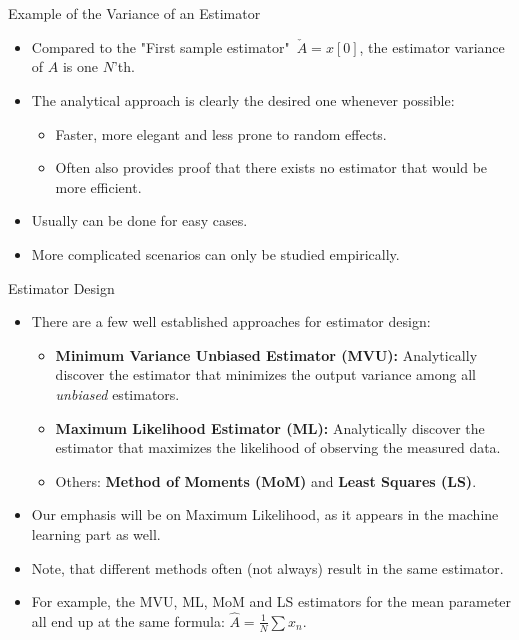 \documentclass[10pt, aspectratio=169]{beamer} %
\begin{document}
\begin{frame}{Example of the Variance of an Estimator}
\begin{itemize}
\item Compared to the "First sample estimator"\ $\check{A} = x[0]$, the estimator variance of $\hat{A}$ is one $N$'th.
\item The analytical approach is clearly the desired one whenever possible:
\begin{itemize}
\item Faster, more elegant and less prone to random effects.
\item Often also provides proof that there exists no estimator that would be more efficient.
\end{itemize}
\item Usually can be done for easy cases.
\item More complicated scenarios can only be studied empirically.
\end{itemize}
\end{frame}

\begin{frame}{Estimator Design}
\begin{itemize}
\item There are a few well established approaches for estimator design:
\begin{itemize}
\item \textbf{Minimum Variance Unbiased Estimator (MVU):} Analytically discover the estimator
that minimizes the output variance among all \emph{unbiased} estimators.
\item \textbf{Maximum Likelihood Estimator (ML):} Analytically discover the estimator
that maximizes the likelihood of observing the measured data.
\item Others: \textbf{Method of Moments (MoM)} and \textbf{Least Squares (LS)}.
\end{itemize}
\item Our emphasis will be on Maximum Likelihood, as it appears in the machine learning part as well.
\item Note, that different methods often (not always) result in the same estimator.
\item For example, the MVU, ML, MoM and LS estimators for the mean parameter all end up at the
same formula: $\hat{A} = \frac1N\sum x_n$.
\end{itemize}
\end{frame}
\end{document}
